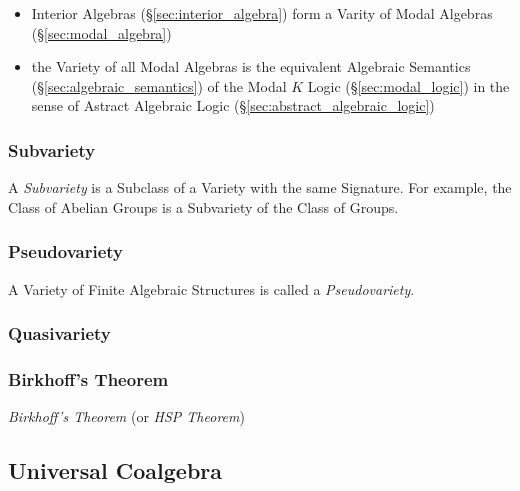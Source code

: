\begin{itemize}
  \item Interior Algebras (\S\ref{sec:interior_algebra}) form a Varity of Modal
    Algebras (\S\ref{sec:modal_algebra})
  \item the Variety of all Modal Algebras is the equivalent Algebraic Semantics
    (\S\ref{sec:algebraic_semantics}) of the Modal $K$ Logic
    (\S\ref{sec:modal_logic}) in the sense of Astract Algebraic Logic
    (\S\ref{sec:abstract_algebraic_logic})
\end{itemize}



\subsubsection{Subvariety}\label{sec:subvariety_theorem}

A \emph{Subvariety} is a Subclass of a Variety with the same
Signature. For example, the Class of Abelian Groups is a Subvariety of
the Class of Groups.



\subsubsection{Pseudovariety}\label{sec:pseudovariety}

A Variety of Finite Algebraic Structures is called a
\emph{Pseudovariety}.



\subsubsection{Quasivariety}\label{sec:quasivariety}



\subsubsection{Birkhoff's Theorem}\label{sec:birkhoffs_theorem}
\cite{birkhoff35}

\emph{Birkhoff's Theorem} (or \emph{HSP Theorem})



\subsection{Universal Coalgebra}\label{sec:universal_coalgebra}

